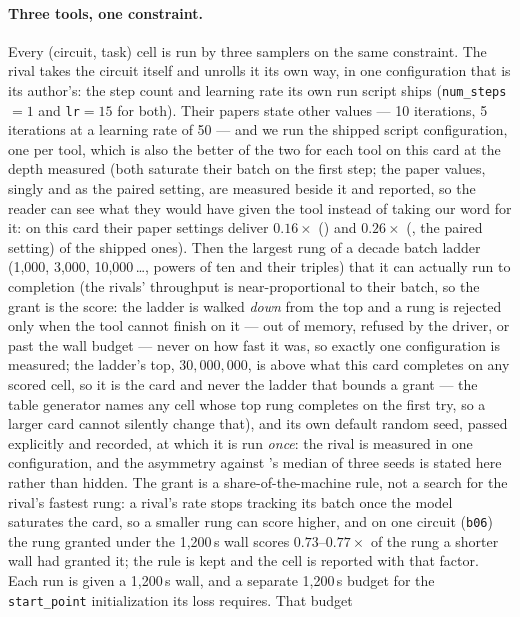 \paragraph{Three tools, one constraint.}
Every (circuit, task) cell is run by three samplers on the same constraint. The rival takes
the circuit itself and unrolls it its own way, in one configuration that is its
author's: the step count and learning rate its own run script ships (\texttt{num\_steps}$=1$ and
\texttt{lr}$=15$ for both). Their papers state other values --- \demotic{} 10 iterations,
\recurrent{} 5 iterations at a learning rate of 50 --- and we run the shipped script
configuration, one per tool, which is also the better of the two for each tool on this card at
the depth measured (both saturate their batch on the first step; the paper values, singly and
as the paired setting, are measured beside it and reported, so the reader can see what they
would have given the tool instead of taking our word for it: on this card their paper settings
deliver $0.16\times$ (\demotic{}) and $0.26\times$ (\recurrent{}, the paired setting) of the
shipped ones). Then the largest rung of a decade batch ladder (1{,}000, 3{,}000, 10{,}000\,\dots, powers of ten and their triples) that it can
actually run to completion (the rivals' throughput is near-proportional to their batch, so the
grant is the score: the ladder is walked \emph{down} from the top and a rung is rejected only
when the tool cannot finish on it --- out of memory, refused by the driver, or past the wall
budget --- never on how fast it was, so exactly one configuration is measured; the ladder's top,
$30{,}000{,}000$, is above what this card completes on any scored cell, so it is the card and
never the ladder that bounds a grant --- the table generator names any cell whose top rung
completes on the first try, so a larger card cannot silently change that), and its own
default random seed, passed explicitly and recorded, at which it is run \emph{once}: the rival
is measured in one configuration, and the asymmetry against \gpap{}'s median of three seeds is
stated here rather than hidden. The grant is a share-of-the-machine rule, not a search for the
rival's fastest rung: a rival's rate stops tracking its batch once the model saturates the
card, so a smaller rung can score higher, and on one circuit (\texttt{b06}) the rung granted
under the 1{,}200\,s wall scores $0.73$--$0.77\times$ of the rung a shorter wall had granted it;
the rule is kept and the cell is reported with that factor. Each run is given a 1{,}200\,s wall, and \recurrent{} a separate
1{,}200\,s budget for the \texttt{start\_point} initialization its loss requires. That budget

